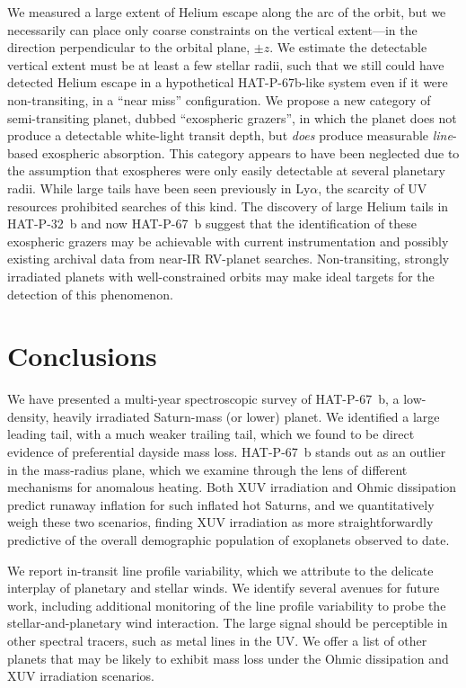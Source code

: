 \documentclass[linenumbers, twocolumn, trackchanges]{aastex631}
\begin{document}
We measured a large extent of Helium escape along the arc of the orbit, but we necessarily can place only coarse constraints on the vertical extent---in the direction perpendicular to the orbital plane, $\pm z$.  We estimate the detectable vertical extent must be at least a few stellar radii, such that we still could have detected Helium escape in a hypothetical HAT-P-67b-like system even if it were non-transiting, in a ``near miss'' configuration.  We propose a new category of semi-transiting planet, dubbed ``exospheric grazers'', in which the planet does not produce a detectable white-light transit depth, but \emph{does} produce measurable \emph{line}-based exospheric absorption.  This category appears to have been neglected due to the assumption that exospheres were only easily detectable at several planetary radii.  While large tails have been seen previously in Ly$\alpha$, the scarcity of UV resources prohibited searches of this kind.  The discovery of large Helium tails in HAT-P-32~b \citep{doi:10.1126/sciadv.adf8736} and now HAT-P-67~b suggest that the identification of these exospheric grazers may be achievable with current instrumentation and possibly existing archival data from near-IR RV-planet searches.  Non-transiting, strongly irradiated planets with well-constrained orbits may make ideal targets for the detection of this phenomenon.


\section{Conclusions}

We have presented a multi-year spectroscopic survey of HAT-P-67~b, a low-density, heavily irradiated Saturn-mass (or lower) planet.  We identified a large leading tail, with a much weaker trailing tail, which we found to be direct evidence of preferential dayside mass loss.  HAT-P-67~b stands out as an outlier in the mass-radius plane, which we examine through the lens of different mechanisms for anomalous heating.  Both XUV irradiation and Ohmic dissipation predict runaway inflation for such inflated hot Saturns, and we quantitatively weigh these two scenarios, finding XUV irradiation as more straightforwardly predictive of the overall demographic population of exoplanets observed to date.

We report in-transit line profile variability, which we attribute to the delicate interplay of planetary and stellar winds.  We identify several avenues for future work, including additional monitoring of the line profile variability to probe the stellar-and-planetary wind interaction.  The large signal should be perceptible in other spectral tracers, such as metal lines in the UV.  We offer a list of other planets that may be likely to exhibit mass loss under the Ohmic dissipation and XUV irradiation scenarios.
\end{document}
